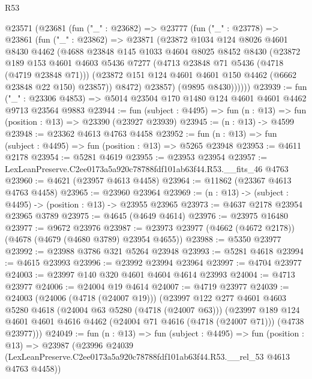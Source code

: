 \begin{lexlean}{R53}
\begin{coremodule}
    @23571
      (@23681
        (fun ("_" : @23682) =>
        @23777
          (fun ("_" : @23778) =>
          @23861
            (fun ("_" : @23862) =>
            @23871
              (@23872
                @1034
                @124
                @8026
                @4601
                @8430
                @4462
                (@4688
                  @23848
                  @145
                  @1033
                  @4604
                  @8025
                  @8452
                  @8430
                  (@23872
                    @189
                    @153
                    @4601
                    @4603
                    @5436
                    @7277
                    (@4713 @23848 @71 @5436 (@4718 (@4719 @23848 @71)))
                    (@23872 @151 @124 @4601 @4601 @150 @4462 (@6662 @23848 @22 @150) @23857))
                  @8472)
                @23857)
              (@9895 @8430))))))
@23939 := fun ("_" : @23306 @4853) =>
  @5014 @23504 @170 @1480 @124 @4601 @4601 @4462 @9713 @23564 @9883
@23944 := fun (subject : @4495) => fun (n : @13) => fun (position : @13) => @23390 (@23927 @23939)
@23945 := (n : @13) -> @4599
@23948 := @23362 @4613 @4763 @4458
@23952 := fun (n : @13) => fun (subject : @4495) => fun (position : @13) => @5265 @23948
@23953 := @4611 @2178
@23954 := @5281 @4619
@23955 := @23953 @23954
@23957 := LexLeanPreserve.C2ee0173a5a920c78788fdf101ab63f44.R53.__fits_46 @4763
@23960 := @4621 (@23957 @4613 @4458)
@23964 := @11862 (@23367 @4613 @4763 @4458)
@23965 := @23960 @23964
@23969 := (n : @13) -> (subject : @4495) -> (position : @13) -> @23955 @23965
@23973 := @4637 @2178 @23954 @23965 @3789
@23975 := @4645 (@4649 @4614)
@23976 := @23975 @16480
@23977 := @9672 @23976
@23987 := @23973 @23977 (@4662 (@4672 @2178)) (@4678 (@4679 (@4680 @3789) @23954 @4655))
@23988 := @5350 @23977
@23992 := @23988 @3786 @321 @5264 @23948
@23993 := @5281 @4618
@23994 := @4615 @23993
@23996 := @23992 @23994 @23964
@23997 := @4704 @23977
@24003 := @23997 @140 @320 @4601 @4604 @4614 @23993
@24004 := @4713 @23977
@24006 := @24004 @19 @4614
@24007 := @4719 @23977
@24039 := @24003
    (@24006 (@4718 (@24007 @19)))
    (@23997
      @122
      @277
      @4601
      @4603
      @5280
      @4618
      (@24004 @63 @5280 (@4718 (@24007 @63)))
      (@23997
        @189
        @124
        @4601
        @4601
        @4616
        @4462
        (@24004 @71 @4616 (@4718 (@24007 @71)))
        (@4738 @23977)))
@24049 := fun (n : @13) =>
  fun (subject : @4495) =>
  fun (position : @13) =>
  @23987
    (@23996
      @24039
      (LexLeanPreserve.C2ee0173a5a920c78788fdf101ab63f44.R53.__rel_53 @4613 @4763 @4458))

\end{coremodule}
\end{lexlean}
